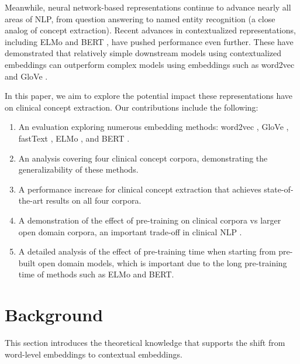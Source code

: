 \documentclass[11pt,a4paper]{article}
\begin{document}
Meanwhile, neural network-based representations continue to advance nearly all areas of NLP, from question answering \cite{shen2017word} to named entity recognition \cite{chang2015application,wu2015study,habibi2017deep,unanue2017recurrent,florez2018named} (a close analog of concept extraction). Recent advances in contextualized representations, including ELMo \cite{peters2018deep} and BERT \cite{devlin2018bert}, have pushed performance even further. These have demonstrated that relatively simple downstream models using contextualized embeddings can outperform complex models \cite{seo2016bidirectional} using embeddings such as word2vec \cite{mikolov2013distributed} and GloVe \cite{pennington2014glove}.

In this paper, we aim to explore the potential impact these representations have on clinical concept extraction. Our contributions include the following:
\begin{enumerate}
\item An evaluation exploring numerous embedding methods: word2vec \cite{mikolov2013distributed}, GloVe \cite{pennington2014glove}, fastText \cite{bojanowski2016enriching}, ELMo \cite{peters2018deep}, and BERT \cite{devlin2018bert}.
\item An analysis covering four clinical concept corpora, demonstrating the generalizability of these methods.
\item A performance increase for clinical concept extraction that achieves state-of-the-art results on all four corpora.
\item A demonstration of the effect of pre-training on clinical corpora vs larger open domain corpora, an important trade-off in clinical NLP \cite{roberts2016assessing}.
\item A detailed analysis of the effect of pre-training time when starting from pre-built open domain models, which is important due to the long pre-training time of methods such as ELMo and BERT.
\end{enumerate}

\section{Background}

This section introduces the theoretical knowledge that supports the shift from word-level embeddings to contextual embeddings.
\end{document}
